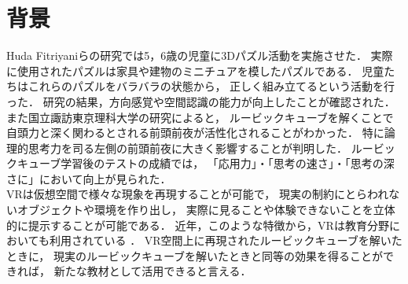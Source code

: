 \section{背景}
  Huda Fitriyaniらの研究では5，6歳の児童に3Dパズル活動を実施させた．
  実際に使用されたパズルは家具や建物のミニチュアを模したパズルである．
  児童たちはこれらのパズルをバラバラの状態から，
  正しく組み立てるという活動を行った．
  研究の結果，方向感覚や空間認識の能力が向上したことが確認された．
  また国立諏訪東京理科大学の研究によると，
  ルービックキューブを解くことで
  自頭力と深く関わるとされる前頭前夜が活性化されることがわかった．
  特に論理的思考力を司る左側の前頭前夜に大きく影響することが判明した．
  ルービックキューブ学習後のテストの成績では，
  「応用力」・「思考の速さ」・「思考の深さに」において向上が見られた．
  \\\indent
  VRは仮想空間で様々な現象を再現することが可能で，
  現実の制約にとらわれないオブジェクトや環境を作り出し，
  実際に見ることや体験できないことを立体的に提示することが可能である．
  近年，このような特徴から，VRは教育分野においても利用されている
  \cite{全天球}\cite{授業実践}．
  VR空間上に再現されたルービックキューブを解いたときに，
  現実のルービックキューブを解いたときと同等の効果を得ることができれば，
  新たな教材として活用できると言える．
